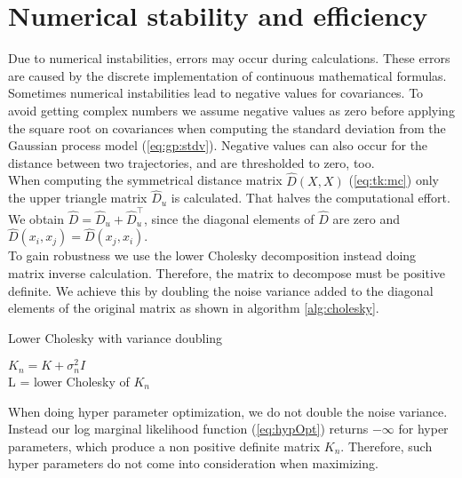 \section{Numerical stability and efficiency}
Due to numerical instabilities, errors may occur during calculations. These errors are caused by the discrete implementation of continuous mathematical formulas. Sometimes numerical instabilities lead to negative values for covariances. To avoid getting complex numbers we assume negative values as zero before applying the square root on covariances when computing the standard deviation from the Gaussian process model (\ref{eq:gp:stdv}). Negative values can also occur for the distance between two trajectories, and are thresholded to zero, too.\\

When computing the symmetrical distance matrix $\hat{D}(X,X)$ (\ref{eq:tk:mc}) only the upper triangle matrix $\hat{D}_{u}$ is calculated. That halves the computational effort. We obtain $\hat{D} = \hat{D}_{u}+\hat{D}_{u}^\top$, since the diagonal elements of $\hat{D}$ are zero and $\hat{D}(x_i,x_j) = \hat{D}(x_j,x_i)$.\\

To gain robustness we use the lower Cholesky decomposition instead doing matrix inverse calculation. Therefore, the matrix to decompose must be positive definite. We achieve this by doubling the noise variance added to the diagonal elements of the original matrix as shown in algorithm \ref{alg:cholesky}.

\begin{algorithm}
    \caption{Lower Cholesky with variance doubling\label{alg:cholesky}}
    \BlankLine
    $K_n = K+\sigma_n^2 I$\\
    L = lower Cholesky of $K_n$\\
\end{algorithm}

When doing hyper parameter optimization, we do not double the noise variance. Instead our log marginal likelihood function (\ref{eq:hypOpt}) returns $-\infty$ for hyper parameters, which produce a non positive definite matrix $K_n$. Therefore, such hyper parameters do not come into consideration when maximizing.

